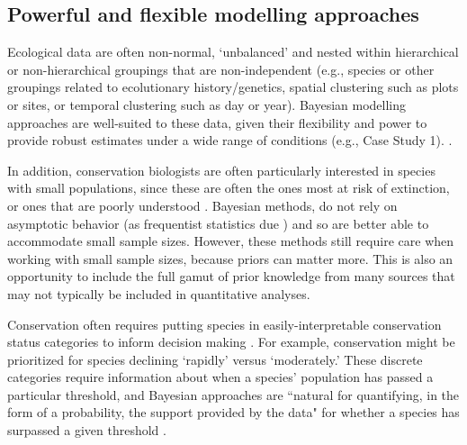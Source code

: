 \documentclass{article}
\begin{document}
\subsection*{Powerful and flexible modelling approaches}
\par Ecological data are often non-normal, `unbalanced' and nested within hierarchical or non-hierarchical groupings that are non-independent (e.g., species or other groupings related to ecolutionary history/genetics, spatial clustering such as plots or sites, or temporal clustering such as day or year). Bayesian modelling approaches are well-suited to these data, given their flexibility and power to provide robust estimates under a wide range of conditions (e.g., Case Study 1). . %
\par In addition, conservation biologists are often particularly interested in species with small populations, since these are often the ones most at risk of extinction, or ones that are poorly understood \citep{stinchcombe2002influence}. Bayesian methods,  do not rely on asymptotic behavior (as frequentist statistics due \citep{mcneish2016using}) and so are better able to accommodate small sample sizes. However, these methods still require care when working with small sample sizes, because priors can matter more. This is also an opportunity to include the full gamut of prior knowledge from many sources that may not typically be included in quantitative analyses. %

\par Conservation often requires putting species in easily-interpretable conservation status categories to inform decision making \citep{brooks2008quantifying}. For example, conservation might be prioritized for species declining `rapidly' versus `moderately.' These discrete categories require information about when a species' population has passed a particular threshold, and Bayesian approaches are ``natural for quantifying, in the form of a probability, the support provided by the data" for whether a species has surpassed a given threshold  \citep{brooks2008quantifying}. 
\end{document}

